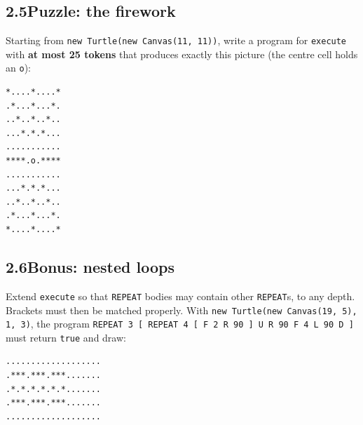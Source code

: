 \documentclass[11pt,a4paper]{article}
\newcommand{\code}[1]{\lstinline[basicstyle=\ttfamily\normalsize,basewidth=0.5em]{#1}}
\begin{document}
\filbreak
\subsection*{2.5\quad Puzzle: the firework}

Starting from \code{new Turtle(new Canvas(11, 11))}, write a program for
\code{execute} with \textbf{at most 25 tokens} that produces exactly this picture
(the centre cell holds an \code{o}):\par
\begin{minipage}{\textwidth}
\begin{lstlisting}[style=out]
*....*....*
.*...*...*.
..*..*..*..
...*.*.*...
...........
****.o.****
...........
...*.*.*...
..*..*..*..
.*...*...*.
*....*....*
\end{lstlisting}
\end{minipage}

\subsection*{2.6\quad Bonus: nested loops}

Extend \code{execute} so that \code{REPEAT} bodies may contain other
\code{REPEAT}s, to any depth. Brackets must then be matched properly. With
\code{new Turtle(new Canvas(19, 5), 1, 3)}, the program
\code{REPEAT 3 [ REPEAT 4 [ F 2 R 90 ] U R 90 F 4 L 90 D ]} must return
\code{true} and draw:
\begin{lstlisting}[style=out]
...................
.***.***.***.......
.*.*.*.*.*.*.......
.***.***.***.......
...................
\end{lstlisting}
\end{document}
